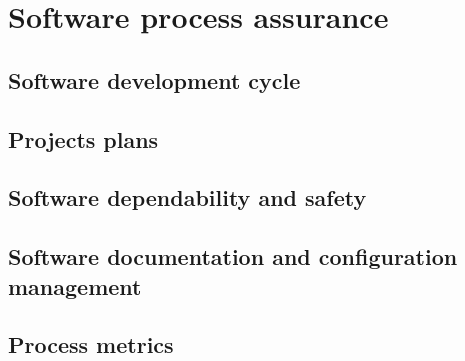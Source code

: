 
\chapter{Software process assurance}

\section{	Software development cycle}

\section{	Projects plans}
\section{Software dependability and safety}
\section{Software documentation and configuration management}
\section{	Process metrics}
